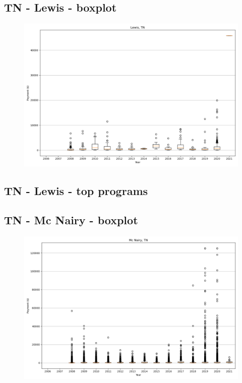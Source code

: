 \subsection*{TN - Lewis - boxplot}
\begin{figure}[h]
\centering
\includegraphics[width=7in]{../output/boxplots/counties/Lewis-TN_boxplot.png}
\end{figure}


\subsection*{TN - Lewis - top programs}

\newpage
\subsection*{TN - Mc Nairy - boxplot}
\begin{figure}[h]
\centering
\includegraphics[width=7in]{../output/boxplots/counties/Mc Nairy-TN_boxplot.png}
\end{figure}


